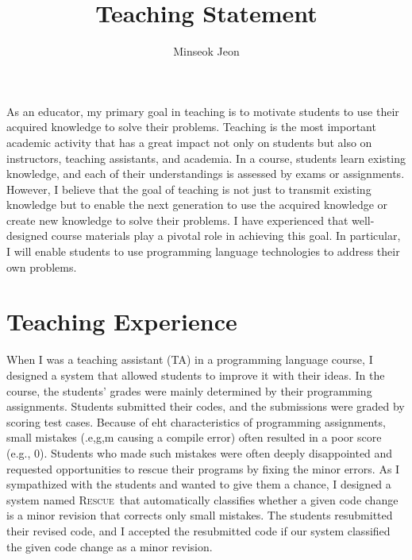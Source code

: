 \documentclass[11pt]{article}
\newcommand{\Rescue}{\textsc{Rescue}}
\begin{document}
\title{Teaching Statement}
\author{Minseok Jeon}
\date{}

\maketitle




As an educator, my primary goal in teaching is to motivate students to use their acquired knowledge to solve their problems. 
% 
Teaching is the most important academic activity that has a great impact not only on students but also on instructors, teaching assistants, and academia. 
% 
In a course, students learn existing knowledge, and each of their understandings is assessed by exams or assignments.
% 
However, I believe that the goal of teaching is not just to transmit existing knowledge but to enable the next generation to use the acquired knowledge or create new knowledge to solve their problems. 
% 
I have experienced that well-designed course materials play a pivotal role in achieving this goal.
%
In particular, I will enable students to use programming language technologies to address their own problems.









\section{Teaching Experience}
When I was a teaching assistant (TA) in a programming language course, I designed a system that allowed students to improve it with their ideas.
%
In the course, the students' grades were mainly determined by their programming assignments.
%
Students submitted their codes, and the submissions were graded by scoring test cases.
%
Because of eht characteristics of programming assignments, small mistakes (.e,g,m causing a compile error) often resulted in a poor score (e.g., 0).
%
Students who made such mistakes were often deeply disappointed and requested opportunities to rescue their programs by fixing the minor errors. 
%
As I sympathized with the students and wanted to give them a chance, I designed a system named \Rescue~that automatically classifies whether a given code change is a minor revision that corrects only small mistakes. 
%
The students resubmitted their revised code, and I accepted the resubmitted code if our system classified the given code change as a minor revision.
\end{document}
